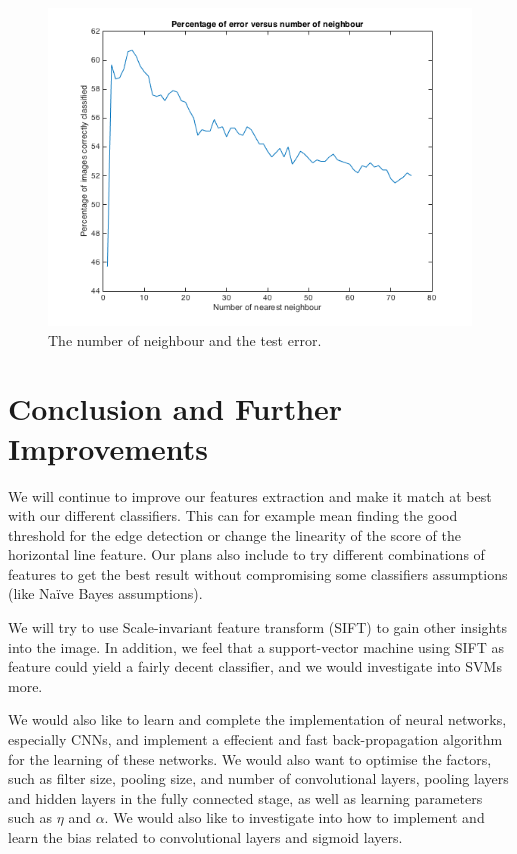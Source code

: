 \documentclass{article} %
\begin{document}
\begin{figure}
\centering
\includegraphics{kChoice.png}
\caption{The number of neighbour and the test error. }
\end{figure}






\section{Conclusion and Further Improvements}
We will continue to improve our features extraction and make it match at best with our different classifiers. This can for example mean finding the good threshold for the edge detection or change the linearity of the score of the horizontal line feature. Our plans also include to try different combinations of features to get the best result without compromising some classifiers assumptions (like Na\"ive Bayes assumptions).

We will try to use Scale-invariant feature transform (SIFT) to gain other insights into the image. In addition, we feel that a support-vector machine using SIFT as feature could yield a fairly decent classifier, and we would investigate into SVMs more.

We would also like to learn and complete the implementation of neural networks, especially CNNs, and implement a effecient and fast back-propagation algorithm for the learning of these networks. We would also want to optimise the factors, such as filter size, pooling size, and number of convolutional layers, pooling layers and hidden layers in the fully connected stage, as well as learning parameters such as $\eta$ and $\alpha$. We would also like to investigate into how to implement and learn the bias related to convolutional layers and sigmoid layers.
\end{document}
